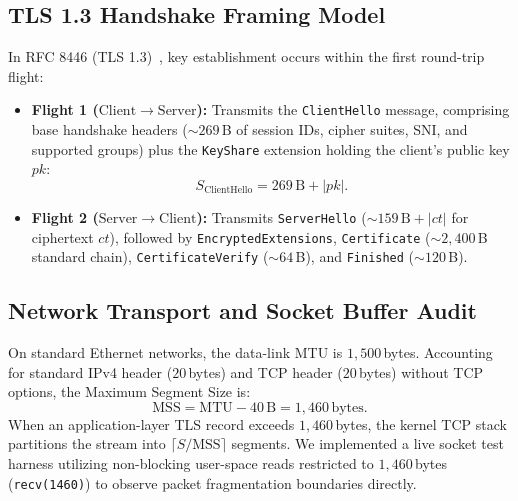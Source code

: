 \subsection{TLS 1.3 Handshake Framing Model}
In RFC 8446 (TLS 1.3)~\cite{rescorla2018}, key establishment occurs within the first round-trip flight:
\begin{itemize}
    \item \textbf{Flight 1 ($\mathrm{Client} \to \mathrm{Server}$):} Transmits the \texttt{ClientHello} message, comprising base handshake headers ($\sim 269\,$B of session IDs, cipher suites, SNI, and supported groups) plus the \texttt{KeyShare} extension holding the client's public key $pk$:
    \begin{equation}
    S_{\mathrm{ClientHello}} = 269\,\mathrm{B} + |pk|.
    \end{equation}
    \item \textbf{Flight 2 ($\mathrm{Server} \to \mathrm{Client}$):} Transmits \texttt{ServerHello} ($\sim 159\,\mathrm{B} + |ct|$ for ciphertext $ct$), followed by \texttt{EncryptedExtensions}, \texttt{Certificate} ($\sim 2{,}400\,$B standard chain), \texttt{CertificateVerify} ($\sim 64\,$B), and \texttt{Finished} ($\sim 120\,$B).
\end{itemize}

\subsection{Network Transport and Socket Buffer Audit}
On standard Ethernet networks, the data-link MTU is $1{,}500\,$bytes. Accounting for standard IPv4 header ($20\,$bytes) and TCP header ($20\,$bytes) without TCP options, the Maximum Segment Size is:
\begin{equation}
\mathrm{MSS} = \mathrm{MTU} - 40\,\mathrm{B} = 1{,}460\,\mathrm{bytes}.
\end{equation}
When an application-layer TLS record exceeds $1{,}460\,$bytes, the kernel TCP stack partitions the stream into $\lceil S / \mathrm{MSS} \rceil$ segments. We implemented a live socket test harness utilizing non-blocking user-space reads restricted to $1{,}460\,$bytes (\texttt{recv(1460)}) to observe packet fragmentation boundaries directly.

